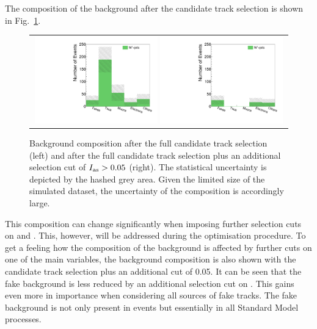 The composition of the background after the candidate track selection is shown in Fig.~\ref{fig:BkgComposition}.
\begin{figure}[!bt]
  \centering 
  \begin{tabular}{c}
    \includegraphics[width=0.49\textwidth]{figures/analysis/htrackgenParticleSmallRange_lin_chiTracksfullSelectionTrigger.pdf}
    \includegraphics[width=0.49\textwidth]{figures/analysis/htrackgenParticleSmallRange_lin_chiTracksfullSelectionPlusIasTrigger.pdf}
  \end{tabular}
  \caption{Background composition after the full candidate track selection (left) and after the full candidate track selection plus an additional selection cut of \mbox{$I_{\text{as}}>0.05$} (right). 
           The statistical uncertainty is depicted by the hashed grey area.
           Given the limited size of the simulated \WJets dataset, the uncertainty of the composition is accordingly large.}
  \label{fig:BkgComposition}
\end{figure}
This composition can change significantly when imposing further selection cuts on \pt and \ias.
This, however, will be addressed during the optimisation procedure.
To get a feeling how the composition of the background is affected by further cuts on one of the main variables, 
the background composition is also shown with the candidate track selection plus an additional \ias cut of 0.05.
It can be seen that the fake background is less reduced by an additional selection cut on \ias.
This gains even more in importance when considering all sources of fake tracks.
The fake background is not only present in \WJets events but essentially in all Standard Model processes.\\

